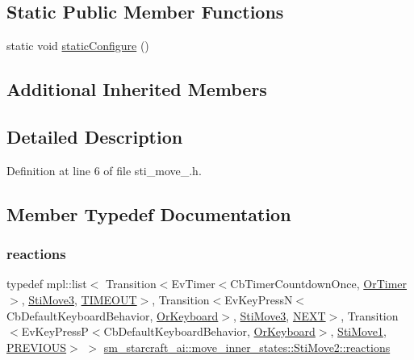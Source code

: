 \subsection*{Static Public Member Functions}
\begin{DoxyCompactItemize}
\item 
static void \hyperlink{structsm__starcraft__ai_1_1move__inner__states_1_1StiMove2_a5d2748899e99bf46ee3135d41ac1a33f}{static\+Configure} ()
\end{DoxyCompactItemize}
\subsection*{Additional Inherited Members}


\subsection{Detailed Description}


Definition at line 6 of file sti\+\_\+move\+\_.\+h.



\subsection{Member Typedef Documentation}
\mbox{\label{structsm__starcraft__ai_1_1move__inner__states_1_1StiMove2_a8187cf9544687d15078665a7065c1360}} 
\subsubsection{\texorpdfstring{reactions}{reactions}}
{\footnotesize\ttfamily typedef mpl\+::list$<$ Transition$<$Ev\+Timer$<$Cb\+Timer\+Countdown\+Once, \hyperlink{classsm__starcraft__ai_1_1OrTimer}{Or\+Timer}$>$, \hyperlink{structsm__starcraft__ai_1_1move__inner__states_1_1StiMove3}{Sti\+Move3}, \hyperlink{structsm__starcraft__ai_1_1move__inner__states_1_1StiMove2_1_1TIMEOUT}{T\+I\+M\+E\+O\+UT}$>$, Transition$<$Ev\+Key\+PressN$<$Cb\+Default\+Keyboard\+Behavior, \hyperlink{classsm__starcraft__ai_1_1OrKeyboard}{Or\+Keyboard}$>$, \hyperlink{structsm__starcraft__ai_1_1move__inner__states_1_1StiMove3}{Sti\+Move3}, \hyperlink{structsm__starcraft__ai_1_1move__inner__states_1_1StiMove2_1_1NEXT}{N\+E\+XT}$>$, Transition$<$Ev\+Key\+PressP$<$Cb\+Default\+Keyboard\+Behavior, \hyperlink{classsm__starcraft__ai_1_1OrKeyboard}{Or\+Keyboard}$>$, \hyperlink{structsm__starcraft__ai_1_1move__inner__states_1_1StiMove1}{Sti\+Move1}, \hyperlink{structsm__starcraft__ai_1_1move__inner__states_1_1StiMove2_1_1PREVIOUS}{P\+R\+E\+V\+I\+O\+US}$>$ $>$ \hyperlink{structsm__starcraft__ai_1_1move__inner__states_1_1StiMove2_a8187cf9544687d15078665a7065c1360}{sm\+\_\+starcraft\+\_\+ai\+::move\+\_\+inner\+\_\+states\+::\+Sti\+Move2\+::reactions}}



